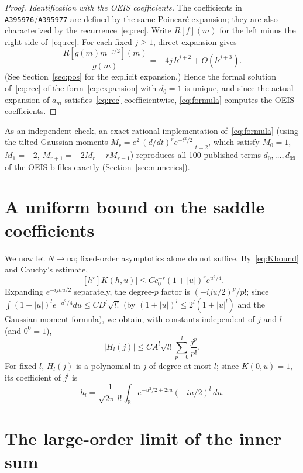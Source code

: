 \documentclass[11pt,a4paper]{article}
\theoremstyle{remark}
\newcommand{\oeis}[1]{\href{https://oeis.org/#1}{\texttt{#1}}}
\begin{document}
\begin{proof}
\emph{Identification with the OEIS coefficients.} The coefficients in \oeis{A395976}/\oeis{A395977} are defined by the same Poincar\'e expansion; they are also characterized by the recurrence~\eqref{eq:rec}. Write $R[f](m)$ for the left minus the right side of~\eqref{eq:rec}. For each fixed $j\ge1$, direct expansion gives
\begin{equation}\label{eq:Rg}
  \frac{R[g(m)m^{-j/2}](m)}{g(m)}=-4j\,h^{j+2}+O(h^{j+3}).
\end{equation}
(See Section~\ref{sec:pos} for the explicit expansion.) Hence the formal solution of~\eqref{eq:rec} of the form~\eqref{eq:expansion} with $d_0=1$ is unique, and since the actual expansion of $a_m$ satisfies~\eqref{eq:rec} coefficientwise, \eqref{eq:formula} computes the OEIS coefficients.
\end{proof}

As an independent check, an exact rational implementation of~\eqref{eq:formula} (using the tilted Gaussian moments $M_r=e^2\,(d/dt)^re^{-t^2/2}|_{t=2}$, which satisfy $M_0=1$, $M_1=-2$, $M_{r+1}=-2M_r-rM_{r-1}$) reproduces all 100 published terms $d_0,\dots,d_{99}$ of the OEIS b-files exactly (Section~\ref{sec:numerics}).

\section{A uniform bound on the saddle coefficients}\label{sec:uniform}

We now let $N\to\infty$; fixed-order asymptotics alone do not suffice. By~\eqref{eq:Kbound} and Cauchy's estimate,
\[
  \bigl|[h^r]K(h,u)\bigr|\le Cc_0^{-r}(1+|u|)^re^{u^2/4}.
\]
Expanding $e^{-ijhu/2}$ separately, the degree-$p$ factor is $(-iju/2)^p/p!$; since $\int(1+|u|)^le^{-u^2/4}du\le CD^l\sqrt{l!}$ (by $(1+|u|)^l\le2^l(1+|u|^l)$ and the Gaussian moment formula), we obtain, with constants independent of $j$ and $l$ (and $0^0=1$),
\begin{equation}\label{eq:Hbound}
  |H_l(j)|\le CA^l\sqrt{l!}\sum_{p=0}^l\frac{j^p}{p!} .
\end{equation}
For fixed $l$, $H_l(j)$ is a polynomial in $j$ of degree at most $l$; since $K(0,u)=1$, its coefficient of $j^l$ is
\begin{equation}\label{eq:hl}
  h_l=\frac1{\sqrt{2\pi}\,l!}\int_{\mathbb R}e^{-u^2/2+2iu}(-iu/2)^l\,du .
\end{equation}

\section{The large-order limit of the inner sum}\label{sec:limit}
\end{document}
